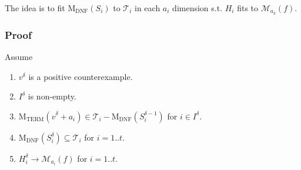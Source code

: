\documentclass[12pt]{llncs}
\newcommand{\cM}{\mathcal{M}}
\newcommand{\cT}{\mathcal{T}}
\newcommand{\MDNF}{\mathrm{M}_\mathrm{DNF}}
\newcommand{\MTERM}{\mathrm{M}_\mathrm{TERM}}
\begin{document}
The idea is to fit $\MDNF(S_i)$ to $\cT_i$
in each $a_i$ dimension s.t.
$H_i$ fits to $\cM_{a_k} ( f )$.

\newpage
\subsubsection*{Proof}
Assume
\begin{enumerate}
\item $v^\delta$ is a positive counterexample.
\item $I^\delta$ is non-empty.
\item $\MTERM(\widehat{v}^\delta + a_i) \in \cT_i - \MDNF(S_i^{\delta-1})$ for $i \in I^\delta$.
\item $\MDNF(S_i^\delta) \subseteq \cT_i$ for $i = 1 .. t$.
\item $H_i^\delta \to \cM_{a_i}(f)$ for $i = 1 .. t$.
\end{enumerate}
\end{document}
